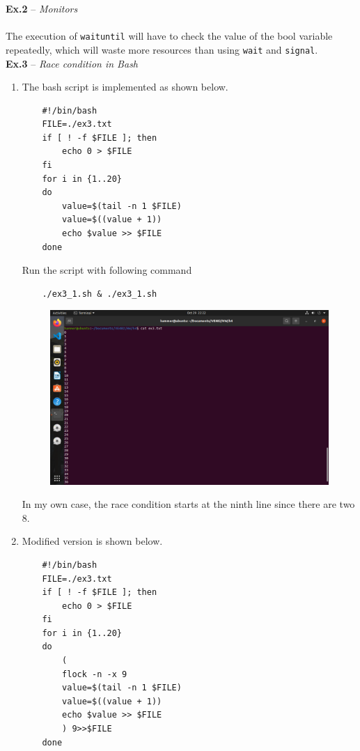 \documentclass{article}
\begin{document}
\noindent\textbf{Ex.2} -- \textit{Monitors}\\ \\
	The execution of \texttt{waituntil} will have to check the value of the bool variable repeatedly, which will waste more resources than using \texttt{wait} and \texttt{signal}.\\

\noindent\textbf{Ex.3} -- \textit{Race condition in Bash}
\begin{enumerate}
    \item The bash script is implemented as shown below.
    \begin{verbatim}
    #!/bin/bash
    FILE=./ex3.txt
    if [ ! -f $FILE ]; then
        echo 0 > $FILE
    fi
    for i in {1..20}
    do
        value=$(tail -n 1 $FILE)
        value=$((value + 1))
        echo $value >> $FILE
    done
    \end{verbatim}
    
    Run the script with following command
    \begin{verbatim}
    ./ex3_1.sh & ./ex3_1.sh
    \end{verbatim}
    \begin{figure}[htb]
        \centering
        \includegraphics[width=0.8\linewidth]{ex3_1.png}
    \end{figure}
    In my own case, the race condition starts at the ninth line since there are two 8.
    \item Modified version is shown below.
    \begin{verbatim}
    #!/bin/bash
    FILE=./ex3.txt
    if [ ! -f $FILE ]; then
        echo 0 > $FILE
    fi
    for i in {1..20}
    do
        (
        flock -n -x 9
        value=$(tail -n 1 $FILE)
        value=$((value + 1))
        echo $value >> $FILE
        ) 9>>$FILE
    done
    \end{verbatim}
\end{enumerate}
\end{document}
